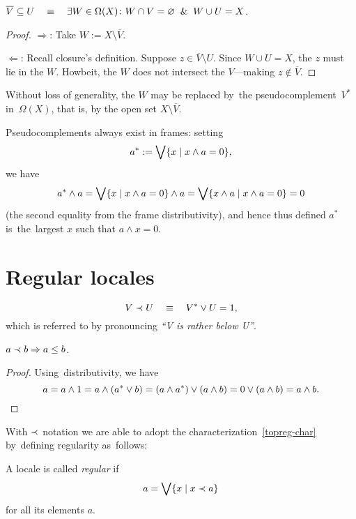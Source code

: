 \begin{lem}
  $\overline{V}\subseteq U \quad \equiv \quad \exists W\in \Omega(X)\colon W \cap V =
  \varnothing \;\; \& \;\; W \cup U = X$.
\end{lem}
\begin{proof}
  $\Rightarrow$:
  Take $W := X\setminus \overline{V}$.

  $\Leftarrow$:
  Recall closure's definition.
  Suppose $z\in \overline{V}\setminus U$.
  Since $W \cup U = X$, the $z$ must lie in the $W$.
  Howbeit, the $W$ does not intersect the $V$---making $z\not\in \overline{V}$.
\end{proof}

Without loss of generality, the $W$ may be replaced by~the
pseudocomplement~$V^*$ in~$\Omega(X)$, that is, by the open set $X\setminus
\overline{V}$.

\begin{rem}
Pseudocomplements always exist in frames:
setting
\[
  a^* := \bigvee \{x \mid x \wedge a = 0\},
\]
we have
\[
  a^* \wedge a = \bigvee \{x \mid x \wedge a = 0\} \wedge a = \bigvee \{x \wedge
  a \mid x \wedge a = 0\} = 0
\]
(the second equality from the frame distributivity), and hence thus defined
$a^*$ is~the~largest $x$ such that $a \wedge x = 0$.
\end{rem}

\section{Regular locales}

\begin{framed}
  \begin{nota}[$\rb$]
    \[
      V \prec U \quad \equiv \quad V^* \vee U = 1,
    \]
    which is referred to by pronouncing \emph{``V is rather below U''\/}.
  \end{nota}
\end{framed}

\begin{lem} \label{rb->leq}
  $a \prec b \Rightarrow a \leq b$.
\end{lem}
\begin{proof}
  Using~distributivity, we have
  \[
    a = a \wedge 1 = a \wedge (a^* \vee b) = (a \wedge a^*) \vee (a \wedge b) =
    0 \vee (a \wedge b) = a \wedge b. \qedhere
  \]
\end{proof}

With $\rb$ notation we are able to adopt the characterization~\ref{topreg-char}
by~defining regularity as~follows:
\begin{framed}
  \begin{df}[Reg]
    A locale is called \emph{regular\/} if
    \[
      a = \bigvee \{x \mid x \prec a\}
    \]
    for all its elements $a$.
  \end{df}
\end{framed}

